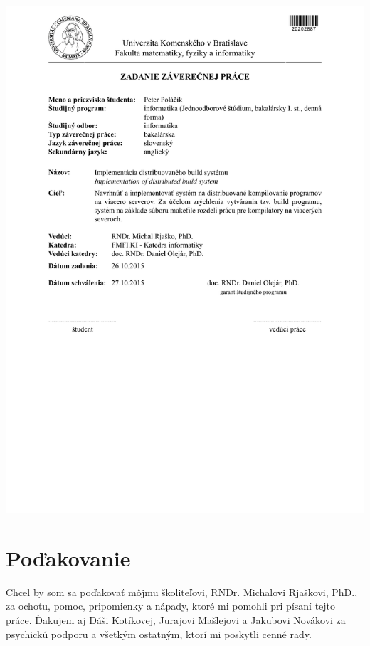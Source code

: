 \documentclass[12pt, oneside]{book}
\begin{document}
\newpage
\thispagestyle{empty}
\hspace{-2cm}\includegraphics[width=1.1\textwidth]{images/assignment}


\frontmatter

\setcounter{page}{3}

\newpage
\section*{Poďakovanie}

Chcel by som sa poďakovať môjmu školiteľovi, RNDr. Michalovi Rjaškovi, PhD., za ochotu,
pomoc, pripomienky a nápady, ktoré mi pomohli pri písaní tejto práce. Ďakujem aj
Dáši Kotíkovej, Jurajovi Mašlejovi a Jakubovi Novákovi za psychickú podporu a všetkým
ostatným, ktorí mi poskytli cenné rady.
\end{document}
